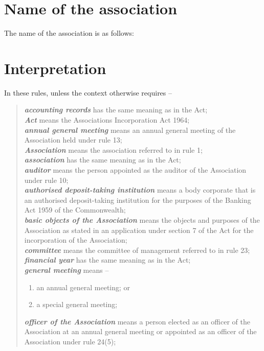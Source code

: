 \documentclass[a4paper,11pt]{article}
\begin{document}
\section{Name of the association}

The name of the association is as follows:\\
\textbf{\orgName{}}

\section{Interpretation}

In these rules, unless the context otherwise requires --
\begin{quote}
	\textit{\textbf{accounting records}} has the same meaning as in the Act;\\
	\textit{\textbf{Act}} means the Associations Incorporation Act 1964;\\
	\textit{\textbf{annual general meeting}} means an annual general meeting of the Association held under rule 13;\\
	\textit{\textbf{Association}} means the association referred to in rule 1;\\
	\textit{\textbf{association}} has the same meaning as in the Act;\\
	\textit{\textbf{auditor}} means the person appointed as the auditor of the Association under rule 10;\\
	\textit{\textbf{authorised deposit-taking institution}} means a body corporate that is an authorised deposit-taking institution for the purposes of the Banking Act 1959 of the Commonwealth;\\
	\textit{\textbf{basic objects of the Association}} means the objects and purposes of the Association as stated in an application under section 7 of the Act for the incorporation of the Association;\\
	\textit{\textbf{committee}} means the committee of management referred to in rule 23;\\
	\textit{\textbf{financial year}} has the same meaning as in the Act;\\
	\textit{\textbf{general meeting}} means --
	\begin{enumerate}
		\item an annual general meeting; or
		\item a special general meeting;
	\end{enumerate}
	\textit{\textbf{officer of the Association}} means a person elected as an officer of the Association at an annual general meeting or appointed as an officer of the Association under rule 24(5);\\

\end{quote}
\end{document}
